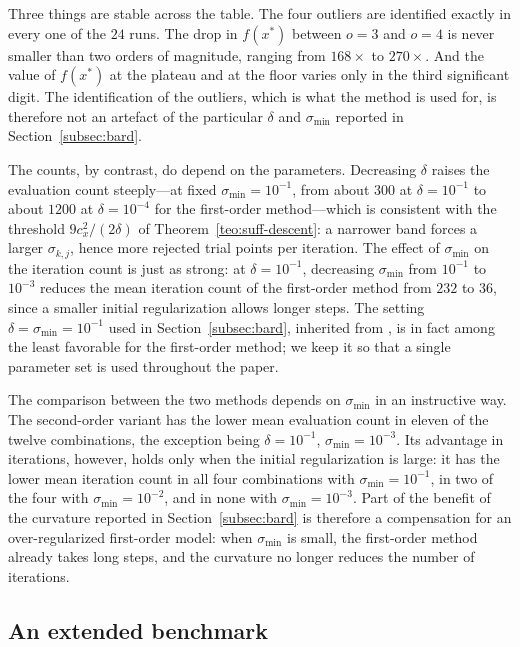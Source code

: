 \documentclass[11pt]{article}
\begin{document}
Three things are stable across the table. The four outliers are identified
exactly in every one of the $24$ runs. The drop in $f(x^*)$ between $o=3$ and
$o=4$ is never smaller than two orders of magnitude, ranging from $168\times$ to
$270\times$. And the value of $f(x^*)$ at the plateau and at the floor varies
only in the third significant digit. The identification of the outliers, which
is what the method is used for, is therefore not an artefact of the particular
$\delta$ and $\sigma_{\min}$ reported in Section~\ref{subsec:bard}.

The counts, by contrast, do depend on the parameters. Decreasing $\delta$
raises the evaluation count steeply---at fixed $\sigma_{\min}=10^{-1}$, from
about $300$ at $\delta=10^{-1}$ to about $1200$ at $\delta=10^{-4}$ for the
first-order method---which is consistent with the threshold $9c_x^2/(2\delta)$
of Theorem~\ref{teo:suff-descent}: a narrower band forces a larger
$\sigma_{k,j}$, hence more rejected trial points per iteration. The effect of
$\sigma_{\min}$ on the iteration count is just as strong: at
$\delta = 10^{-1}$, decreasing $\sigma_{\min}$ from $10^{-1}$ to $10^{-3}$
reduces the mean iteration count of the first-order method from $232$ to $36$,
since a smaller initial regularization allows longer steps. The setting
$\delta=\sigma_{\min}=10^{-1}$ used in Section~\ref{subsec:bard}, inherited
from \cite{alvarezovo}, is in fact among the least favorable for the
first-order method; we keep it so that a single parameter set is used
throughout the paper.

The comparison between the two methods depends on $\sigma_{\min}$ in an
instructive way. The second-order variant has the lower mean evaluation count in
eleven of the twelve combinations, the exception being
$\delta=10^{-1}$, $\sigma_{\min}=10^{-3}$. Its advantage in iterations,
however, holds only when the initial regularization is large: it has the lower
mean iteration count in all four combinations with $\sigma_{\min}=10^{-1}$, in
two of the four with $\sigma_{\min}=10^{-2}$, and in none with
$\sigma_{\min}=10^{-3}$. Part of the benefit of the curvature reported in
Section~\ref{subsec:bard} is therefore a compensation for an over-regularized
first-order model: when $\sigma_{\min}$ is small, the first-order method already
takes long steps, and the curvature no longer reduces the number of iterations.

\subsection{An extended benchmark} \label{subsec:bench}
\end{document}
